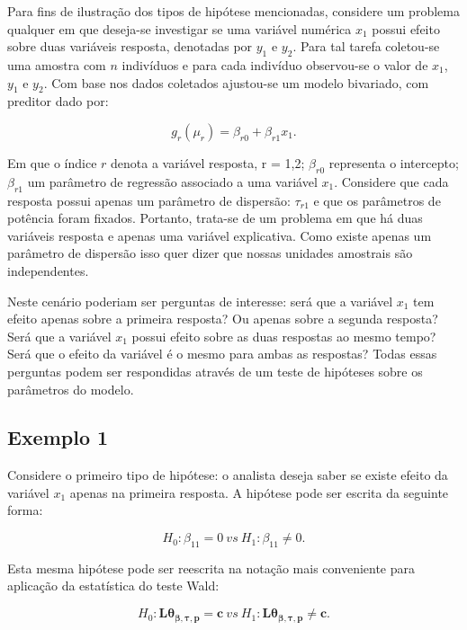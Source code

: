 Para fins de ilustração dos tipos de hipótese mencionadas, considere um problema qualquer em que deseja-se investigar se uma variável numérica $x_1$ possui efeito sobre duas variáveis resposta, denotadas por $y_1$ e $y_2$. Para tal tarefa coletou-se uma amostra com $n$ indivíduos e para cada indivíduo observou-se o valor de $x_1$, $y_1$ e $y_2$. Com base nos dados coletados ajustou-se um modelo bivariado, com preditor dado por:

\begin{equation}
g_r(\mu_r) = \beta_{r0} + \beta_{r1} x_1.
\end{equation}

\noindent Em que o índice $r$ denota a variável resposta, r = 1,2; $\beta_{r0}$ representa o intercepto; $\beta_{r1}$ um parâmetro de regressão associado a uma variável $x_1$. Considere que cada resposta possui apenas um parâmetro de dispersão: $\tau_{r1}$ e que os parâmetros de potência foram fixados. Portanto, trata-se de um problema em que há duas variáveis resposta e apenas uma variável explicativa. Como existe apenas um parâmetro de dispersão isso quer dizer que nossas unidades amostrais são independentes. 

Neste cenário poderiam ser perguntas de interesse: será que a variável $x_1$ tem efeito apenas sobre a primeira resposta? Ou apenas sobre a segunda resposta? Será que a variável $x_1$ possui efeito sobre as duas respostas ao mesmo tempo? Será que o efeito da variável é o mesmo para ambas as respostas? Todas essas perguntas podem ser respondidas através de um teste de hipóteses sobre os parâmetros do modelo.

\subsection{Exemplo 1}

Considere o primeiro tipo de hipótese: o analista deseja saber se existe efeito da variável $x_1$ apenas na primeira resposta. A hipótese pode ser escrita da seguinte forma:

\begin{equation}
H_0: \beta_{11} = 0 \ vs \ H_1: \beta_{11} \neq 0.
\end{equation}

Esta mesma hipótese pode ser reescrita na notação mais conveniente para aplicação da estatística do teste Wald:

\begin{equation}
H_0: \boldsymbol{L}\boldsymbol{\theta_{\beta,\tau,p}} = \boldsymbol{c} \ vs \ H_1: \boldsymbol{L}\boldsymbol{\theta_{\beta,\tau,p}} \neq \boldsymbol{c}.
\end{equation}


